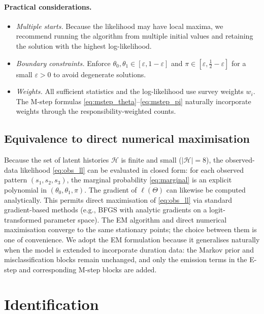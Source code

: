 \documentclass[12pt]{article}
\begin{document}
\paragraph{Practical considerations.}
\begin{itemize}
\item \emph{Multiple starts.} Because the likelihood may have local
  maxima, we recommend running the algorithm from multiple initial
  values and retaining the solution with the highest log-likelihood.
\item \emph{Boundary constraints.} Enforce
  \(\theta_0, \theta_1 \in [\varepsilon, 1 - \varepsilon]\) and
  \(\pi \in [\varepsilon, \tfrac{1}{2} - \varepsilon]\) for a small
  \(\varepsilon > 0\) to avoid degenerate solutions.
\item \emph{Weights.} All sufficient statistics and the log-likelihood
  use survey weights \(w_i\). The M-step formulas
  \eqref{eq:mstep_theta}--\eqref{eq:mstep_pi} naturally incorporate
  weights through the responsibility-weighted counts.
\end{itemize}

\subsection{Equivalence to direct numerical maximisation}
\label{sec:direct_mle}

Because the set of latent histories \(\mathcal{H}\) is finite and small
(\(|\mathcal{H}| = 8\)), the observed-data likelihood
\eqref{eq:obs_ll} can be evaluated in closed form: for each observed
pattern \((s_1, s_2, s_3)\), the marginal probability
\eqref{eq:marginal} is an explicit polynomial in
\((\theta_0, \theta_1, \pi)\). The gradient of \(\ell(\Theta)\) can
likewise be computed analytically. This permits direct maximisation of
\eqref{eq:obs_ll} via standard gradient-based methods (e.g., BFGS with
analytic gradients on a logit-transformed parameter space). The EM
algorithm and direct numerical maximisation converge to the same
stationary points; the choice between them is one of convenience. We
adopt the EM formulation because it generalises naturally when the model
is extended to incorporate duration data: the Markov prior and
misclassification blocks remain unchanged, and only the emission terms
in the E-step and corresponding M-step blocks are added.

\section{Identification}
\label{sec:identification}
\end{document}
